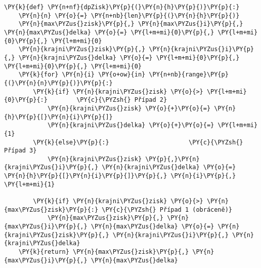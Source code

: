 \begin{Verbatim}[commandchars=\\\{\}]
\PY{k}{def} \PY{n+nf}{dpZisk}\PY{p}{(}\PY{n}{h}\PY{p}{)}\PY{p}{:}
	\PY{n}{n} \PY{o}{=} \PY{n+nb}{len}\PY{p}{(}\PY{n}{h}\PY{p}{)}
	\PY{n}{max\PYZus{}zisk}\PY{p}{,} \PY{n}{max\PYZus{}i}\PY{p}{,} \PY{n}{max\PYZus{}delka} \PY{o}{=} \PY{l+m+mi}{0}\PY{p}{,} \PY{l+m+mi}{0}\PY{p}{,} \PY{l+m+mi}{0}
	\PY{n}{krajni\PYZus{}zisk}\PY{p}{,} \PY{n}{krajni\PYZus{}i}\PY{p}{,} \PY{n}{krajni\PYZus{}delka} \PY{o}{=} \PY{l+m+mi}{0}\PY{p}{,} \PY{l+m+mi}{0}\PY{p}{,} \PY{l+m+mi}{0}
	\PY{k}{for} \PY{n}{i} \PY{o+ow}{in} \PY{n+nb}{range}\PY{p}{(}\PY{n}{n}\PY{p}{)}\PY{p}{:}
		\PY{k}{if} \PY{n}{krajni\PYZus{}zisk} \PY{o}{>} \PY{l+m+mi}{0}\PY{p}{:}        \PY{c}{\PYZsh{} Případ 2}
			\PY{n}{krajni\PYZus{}zisk} \PY{o}{+}\PY{o}{=} \PY{n}{h}\PY{p}{[}\PY{n}{i}\PY{p}{]}
			\PY{n}{krajni\PYZus{}delka} \PY{o}{+}\PY{o}{=} \PY{l+m+mi}{1}
		\PY{k}{else}\PY{p}{:}                      \PY{c}{\PYZsh{} Případ 3}
			\PY{n}{krajni\PYZus{}zisk} \PY{p}{,}\PY{n}{krajni\PYZus{}i}\PY{p}{,} \PY{n}{krajni\PYZus{}delka} \PY{o}{=} \PY{n}{h}\PY{p}{[}\PY{n}{i}\PY{p}{]}\PY{p}{,} \PY{n}{i}\PY{p}{,} \PY{l+m+mi}{1}

		\PY{k}{if} \PY{n}{krajni\PYZus{}zisk} \PY{o}{>} \PY{n}{max\PYZus{}zisk}\PY{p}{:} \PY{c}{\PYZsh{} Případ 1 (obráceně)}
			\PY{n}{max\PYZus{}zisk}\PY{p}{,} \PY{n}{max\PYZus{}i}\PY{p}{,} \PY{n}{max\PYZus{}delka} \PY{o}{=} \PY{n}{krajni\PYZus{}zisk}\PY{p}{,} \PY{n}{krajni\PYZus{}i}\PY{p}{,} \PY{n}{krajni\PYZus{}delka}
	\PY{k}{return} \PY{n}{max\PYZus{}zisk}\PY{p}{,} \PY{n}{max\PYZus{}i}\PY{p}{,} \PY{n}{max\PYZus{}delka}
\end{Verbatim}
